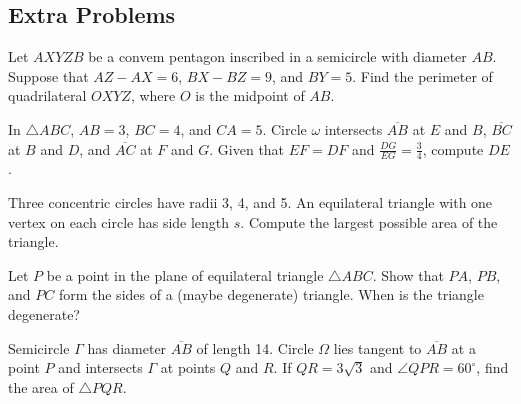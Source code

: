 \documentclass{scrartcl}
\providecommand{\ol}{\overline}
\providecommand{\dg}{^\circ}
\begin{document}
\pagebreak
\subsection{Extra Problems}


\begin{problem}
	Let $AXYZB$ be a convem pentagon inscribed in a semicircle with diameter $AB$.
	Suppose that $AZ - AX = 6$, $BX - BZ = 9$, and $BY = 5$.
	Find the perimeter of quadrilateral $OXYZ$, where $O$ is the midpoint of $AB$.
\end{problem}

\begin{problem}[2014 AIME I/15]
	In $\triangle ABC$, $AB = 3$, $BC = 4$, and $CA = 5$.
	Circle $\omega$ intersects $\overline{AB}$ at $E$ and $B$,
	$\overline{BC}$ at $B$ and $D$, and $\overline{AC}$ at $F$ and $G$.
	Given that $EF = DF$ and $\frac{DG}{EG} = \frac{3}{4}$, compute $DE$.
\end{problem}

\begin{problem}[2012 AIME I/13]
	Three concentric circles have radii 3, 4, and 5.
	An equilateral triangle with one vertex on each circle has side length $s$.
	Compute the largest possible area of the triangle.
\end{problem}

\begin{niceprob}
	Let $P$ be a point in the plane of equilateral triangle $\triangle ABC$.
	Show that $PA$, $PB$, and $PC$ form the sides of a (maybe degenerate) triangle.
	When is the triangle degenerate?
\end{niceprob}

\begin{problem}[AMC 12A 2021/24]
	Semicircle $\Gamma$ has diameter $\ol{AB}$ of length 14.
	Circle $\Omega$ lies tangent to $\ol{AB}$ at a point $P$
	and intersects $\Gamma$ at points $Q$ and $R$.
	If $QR = 3\sqrt3$ and $\angle QPR = 60\dg$, find the area of $\triangle PQR$.
\end{problem}
\end{document}
